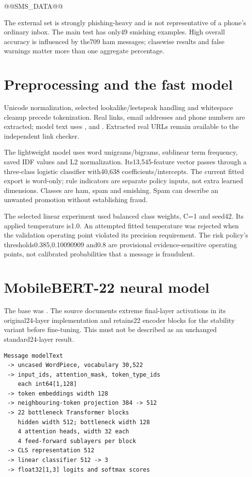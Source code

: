 @@SMS_DATA@@

The external set is strongly phishing-heavy and is not representative of a phone's ordinary inbox. The main test has only49 smishing examples. High overall accuracy is influenced by the709 ham messages; classwise results and false warnings matter more than one aggregate percentage.

\section{Preprocessing and the fast model}
Unicode normalization, selected lookalike/leetspeak handling and whitespace cleanup precede tokenization. Real links, email addresses and phone numbers are extracted; model text uses ,  and . Extracted real URLs remain available to the independent link checker.

The lightweight model uses word unigrams/bigrams, sublinear term frequency, saved IDF values and L2 normalization. Its13,545-feature vector passes through a three-class logistic classifier with40,638 coefficients/intercepts. The current fitted export is word-only; rule indicators are separate policy inputs, not extra learned dimensions. Classes are ham, spam and smishing. Spam can describe an unwanted promotion without establishing fraud.

The selected linear experiment used balanced class weights, C=1 and seed42. Its applied temperature is1.0. An attempted fitted temperature was rejected when the validation operating point violated its precision requirement. The risk policy's thresholds0.385,0.10090909 and0.8 are provisional evidence-sensitive operating points, not calibrated probabilities that a message is fraudulent.

\section{MobileBERT-22 neural model}
The base was . The source documents extreme final-layer activations in its original24-layer implementation and retains22 encoder blocks for the stability variant before fine-tuning. This must not be described as an unchanged standard24-layer result.

\begin{lstlisting}
Message modelText
 -> uncased WordPiece, vocabulary 30,522
 -> input_ids, attention_mask, token_type_ids
    each int64[1,128]
 -> token embeddings width 128
 -> neighbouring-token projection 384 -> 512
 -> 22 bottleneck Transformer blocks
    hidden width 512; bottleneck width 128
    4 attention heads, width 32 each
    4 feed-forward sublayers per block
 -> CLS representation 512
 -> linear classifier 512 -> 3
 -> float32[1,3] logits and softmax scores
\end{lstlisting}

